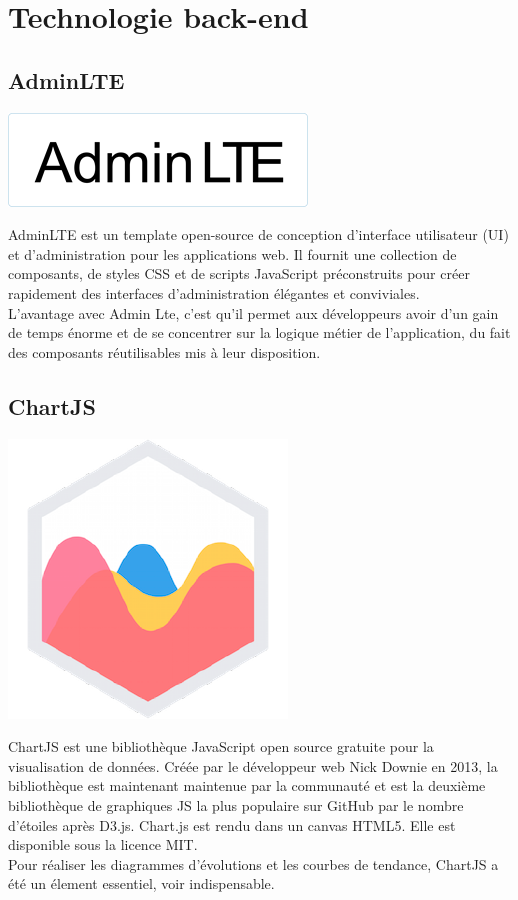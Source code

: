 	\section{Technologie back-end}
		\subsection{AdminLTE}
			\begin{center}
				\includegraphics[scale=0.7]{chap_3/adminlte.png}
				\label{AdminLTE}
				\cite{adminlte_image}
			\end{center}
		AdminLTE est un template open-source de conception d'interface utilisateur (UI) et d'administration pour les applications web. Il fournit une collection de composants, de styles CSS et de scripts JavaScript préconstruits pour créer rapidement des interfaces d'administration élégantes et conviviales.\\
		L'avantage avec Admin Lte, c'est qu'il permet aux développeurs avoir d'un gain de temps énorme et de se concentrer sur la logique métier de l'application, du fait des composants réutilisables mis à leur disposition.
		
		\subsection{ChartJS}
			\begin{center}
				\includegraphics[scale=0.5]{chap_3/chartjs.png}
				\label{ChartJS}
				\cite{chartjs_image}
			\end{center}
			ChartJS est une bibliothèque JavaScript open source gratuite pour la visualisation de données. Créée par le développeur web Nick Downie en 2013, la bibliothèque est maintenant maintenue par la communauté et est la deuxième bibliothèque de graphiques JS la plus populaire sur GitHub par le nombre d'étoiles après D3.js. Chart.js est rendu dans un canvas HTML5. Elle est disponible sous la licence MIT.\cite{chartjs}\\
			Pour réaliser les diagrammes d'évolutions et les courbes de tendance, ChartJS a été un élement essentiel, voir indispensable.
			
